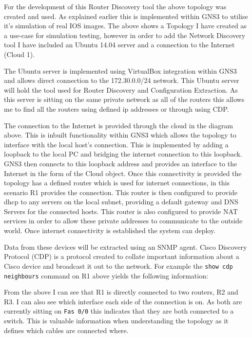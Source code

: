 \documentclass[11pt]{report}
\begin{document}
For the development of this Router Discovery tool the above topology was created and used. As explained earlier this is implemented within GNS3 to utilise it's simulation of real IOS images. The above shows a Topology I have created as a use-case for simulation testing, however in order to add the Network Discovery tool I have included an Ubuntu 14.04 server and a connection to the Internet (Cloud 1).

The Ubuntu server is implemented using VirtualBox integration within GNS3 and allows direct connection to the 172.30.0.0/24 network. This Ubuntu server will hold the tool used for Router Discovery and Configuration Extraction. As this server is sitting on the same private network as all of the routers this allows me to find all the routers using defined ip addresses or through using CDP.

The connection to the Internet is provided through the cloud in the diagram above. This is inbuilt functionality within GNS3 which allows the topology to interface with the local host’s connection. This is implemented by adding a loopback to the local PC and bridging the internet connection to this loopback. GNS3 then connects to this loopback address and provides an interface to the Internet in the form of the Cloud object. Once this connectivity is provided the topology has a defined router which is used for internet connections, in this scenario R1 provides the connection. This router is then configured to provide dhcp to any servers on the local subnet, providing a default gateway and DNS Servers for the connected hosts. This router is also configured to provide NAT services in order to allow these private addresses to communicate to the outside world. Once internet connectivity is established the system can deploy.

Data from these devices will be extracted using an SNMP agent. Cisco Discovery Protocol (CDP) is a protocol created to collate important information about a Cisco device and broadcast it out to the network. For example the {\tt show cdp neighbours} command on R1 above yields the following information:



From the above I can see that R1 is directly connected to two routers, R2 and R3. I can also see which interface each side of the connection is on. As both are currently sitting on {\tt Fas 0/0} this indicates that they are both connected to a switch. This is valuable information when understanding the topology as it defines which cables are connected where.
\end{document}
